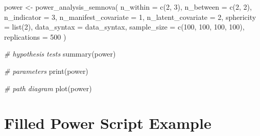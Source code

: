 \documentclass[
]{book}
\newenvironment{Shaded}{\begin{snugshade}}{\end{snugshade}}
\newcommand{\AttributeTok}[1]{\textcolor[rgb]{0.77,0.63,0.00}{#1}}
\newcommand{\CommentTok}[1]{\textcolor[rgb]{0.56,0.35,0.01}{\textit{#1}}}
\newcommand{\DecValTok}[1]{\textcolor[rgb]{0.00,0.00,0.81}{#1}}
\newcommand{\FunctionTok}[1]{\textcolor[rgb]{0.00,0.00,0.00}{#1}}
\newcommand{\NormalTok}[1]{#1}
\newcommand{\OtherTok}[1]{\textcolor[rgb]{0.56,0.35,0.01}{#1}}
\begin{document}
\begin{Shaded}
\begin{Highlighting}[]
\NormalTok{power }\OtherTok{\textless{}{-}} \FunctionTok{power\_analysis\_semnova}\NormalTok{(}
    \AttributeTok{n\_within =} \FunctionTok{c}\NormalTok{(}\DecValTok{2}\NormalTok{, }\DecValTok{3}\NormalTok{),}
    \AttributeTok{n\_between =} \FunctionTok{c}\NormalTok{(}\DecValTok{2}\NormalTok{, }\DecValTok{2}\NormalTok{),}
    \AttributeTok{n\_indicator =} \DecValTok{3}\NormalTok{,}
    \AttributeTok{n\_manifest\_covariate =} \DecValTok{1}\NormalTok{,}
    \AttributeTok{n\_latent\_covariate =} \DecValTok{2}\NormalTok{,}
    \AttributeTok{sphericity =} \FunctionTok{list}\NormalTok{(}\DecValTok{2}\NormalTok{),}
    \AttributeTok{data\_syntax =}\NormalTok{ data\_syntax,}
    \AttributeTok{sample\_size =} \FunctionTok{c}\NormalTok{(}\DecValTok{100}\NormalTok{, }\DecValTok{100}\NormalTok{, }\DecValTok{100}\NormalTok{, }\DecValTok{100}\NormalTok{),}
    \AttributeTok{replications =} \DecValTok{500}
\NormalTok{)}

\CommentTok{\# hypothesis tests}
\FunctionTok{summary}\NormalTok{(power)}

\CommentTok{\# parameters}
\FunctionTok{print}\NormalTok{(power)}

\CommentTok{\# path diagram}
\FunctionTok{plot}\NormalTok{(power)}
\end{Highlighting}
\end{Shaded}

\hypertarget{filled-power-script-example}{%
\chapter{Filled Power Script Example}\label{filled-power-script-example}}
\end{document}
